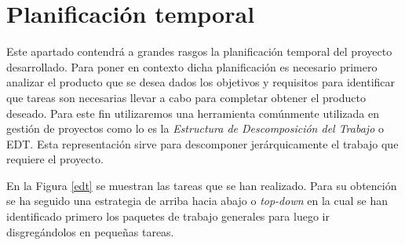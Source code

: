 
\section{Planificación temporal}

Este apartado contendrá a grandes rasgos la planificación temporal del proyecto desarrollado. Para poner en contexto dicha planificación es necesario primero analizar el producto que se desea dados los objetivos y requisitos para identificar que tareas son necesarias llevar a cabo para completar obtener el producto deseado. Para este fin utilizaremos una herramienta comúnmente utilizada en gestión de proyectos como lo es la \textit{Estructura de Descomposición del Trabajo} o EDT. Esta representación sirve para descomponer jerárquicamente el trabajo que requiere el proyecto.

\bigskip

En la Figura \ref{edt} se muestran las tareas que se han realizado. Para su obtención se ha seguido una estrategia de arriba hacia abajo o \textit{top-down} en la cual se han identificado primero los paquetes de trabajo generales para luego ir disgregándolos en pequeñas tareas.

\clearpage


